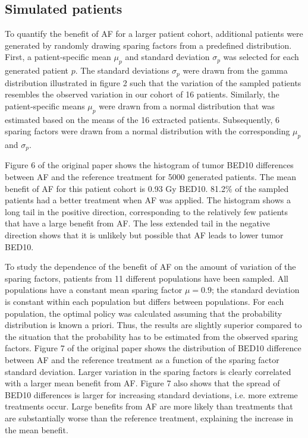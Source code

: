 \documentclass[11pt]{article}
\begin{document}
\subsection{Simulated patients}

To quantify the benefit of AF for a larger patient cohort, additional patients were generated by randomly drawing sparing factors from a predefined distribution. First, a patient-specific mean $\mu_p$ and standard deviation $\sigma_p$ was selected for each generated patient $p$. The standard deviations $\sigma_p$ were drawn from the gamma distribution illustrated in figure 2 such that the variation of the sampled patients resembles the observed variation in our cohort of 16 patients. Similarly, the patient-specific means $\mu_p$ were drawn from a normal distribution that was estimated based on the means of the 16 extracted patients. Subsequently, 6 sparing factors were drawn from a normal distribution with the corresponding $\mu_p$ and $\sigma_p$.

Figure 6 of the original paper shows the histogram of tumor BED10 differences between AF and the reference treatment for 5000 generated patients. The mean benefit of AF for this patient cohort is 0.93 Gy BED10. 81.2\% of the sampled patients had a better treatment when AF was applied. The histogram shows a long tail in the positive direction, corresponding to the relatively few patients that have a large benefit from AF. The less extended tail in the negative direction shows that it is unlikely but possible that AF leads to lower tumor BED10.

To study the dependence of the benefit of AF on the amount of variation of the sparing factors, patients from 11 different populations have been sampled. All populations have a constant mean sparing factor $\mu = 0.9$; the standard deviation is constant within each population but differs between populations. For each population, the optimal policy was calculated assuming that the probability distribution is known a priori. Thus, the results are slightly superior compared to the situation that the probability has to be estimated from the observed sparing factors. Figure 7 of the original paper shows the distribution of BED10 difference between AF and the reference treatment as a function of the sparing factor standard deviation. Larger variation in the sparing factors is clearly correlated with a larger mean benefit from AF. Figure 7 also shows that the spread of BED10 differences is larger for increasing standard deviations, i.e. more extreme treatments occur. Large benefits from AF are more likely than treatments that are substantially worse than the reference treatment, explaining the increase in the mean benefit.
\end{document}
